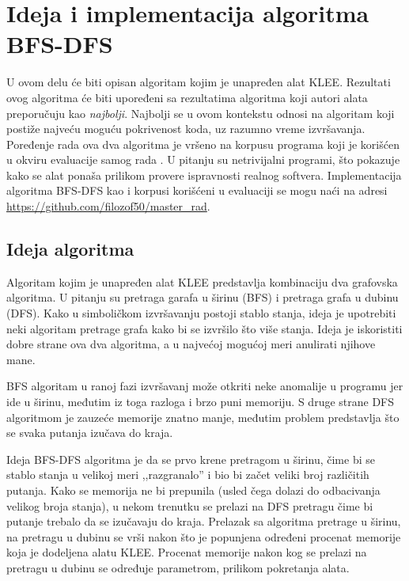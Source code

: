 \documentclass[12pt,oneside]{memoir}
\begin{document}
\chapter{Ideja i implementacija algoritma BFS-DFS} \label{algoritam}
U ovom delu će biti opisan algoritam kojim je unapređen alat KLEE. Rezultati ovog algoritma će biti upoređeni sa rezultatima algoritma koji autori alata preporučuju kao \textit{najbolji}. Najbolji se u ovom kontekstu odnosi na algoritam koji postiže najveću moguću pokrivenost koda, uz razumno vreme izvršavanja. Poređenje rada ova dva algoritma je vršeno na korpusu programa koji je korišćen u okviru evaluacije samog rada \cite{klee}. U pitanju su netrivijalni programi, što pokazuje kako se alat ponaša prilikom provere ispravnosti realnog softvera. Implementacija algoritma BFS-DFS kao i korpusi korišćeni u evaluaciji se mogu naći na adresi \url{https://github.com/filozof50/master_rad}.

\section{Ideja algoritma}
Algoritam kojim je unapređen alat KLEE predstavlja kombinaciju dva grafovska algoritma. U pitanju su pretraga garafa u širinu (BFS) i pretraga grafa u dubinu (DFS). Kako u simboličkom izvršavanju postoji stablo stanja, ideja je upotrebiti neki algoritam pretrage grafa kako bi se izvršilo što više stanja. Ideja je iskoristiti dobre strane ova dva algoritma, a u najvećoj mogućoj meri anulirati njihove mane. 

BFS algoritam u ranoj fazi izvršavanj može otkriti neke anomalije u programu jer ide u širinu, međutim iz toga razloga i brzo puni memoriju. S druge strane DFS algoritmom je zauzeće memorije znatno manje, međutim problem predstavlja što se svaka putanja izučava do kraja. 

Ideja BFS-DFS algoritma je da se prvo krene pretragom u širinu, čime bi se stablo stanja u velikoj meri ,,razgranalo'' i bio bi začet veliki broj različitih putanja. Kako se memorija ne bi prepunila (usled čega dolazi do odbacivanja velikog broja stanja), u nekom trenutku se prelazi na DFS pretragu čime bi putanje trebalo da se izučavaju do kraja. Prelazak sa algoritma pretrage u širinu, na pretragu u dubinu se vrši nakon što je popunjena određeni procenat memorije koja je dodeljena alatu KLEE. Procenat memorije nakon kog se prelazi na pretragu u dubinu se određuje parametrom, prilikom pokretanja alata. 
\end{document}
